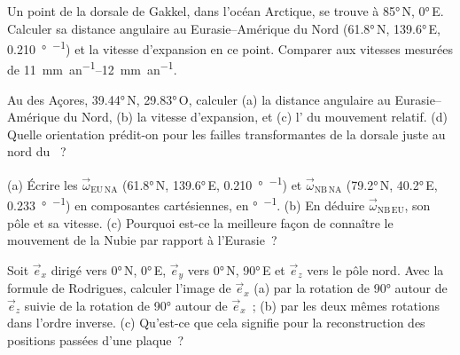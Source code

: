 \begin{exercise}[$\star\star$]\label{exo:b1:plate-kinematics:5}
Un point de la dorsale de Gakkel, dans l'océan Arctique, se trouve à \ang{85}\,N, \ang{0}\,E.
Calculer sa distance angulaire au  Eurasie--Amérique du Nord
(\ang{61.8}\,N, \ang{139.6}\,E, \qty{0.210}{\degree\per\Ma}) et la vitesse d'expansion
en ce point. Comparer aux vitesses mesurées de \qtyrange{11}{12}{mm.an^{-1}}.
\end{exercise}

\begin{exercise}[$\star\star$]\label{exo:b1:plate-kinematics:6}
Au  des Açores, \ang{39.44}\,N, \ang{29.83}\,O, calculer (a) la
distance angulaire au  Eurasie--Amérique du Nord, (b) la vitesse
d'expansion, et (c) l' du mouvement relatif. (d) Quelle orientation
prédit-on pour les failles transformantes de la dorsale juste au nord du ~?
\end{exercise}

\begin{exercise}[$\star\star$]\label{exo:b1:plate-kinematics:7}
(a) Écrire les  $\vec\omega_{\mathrm{EU\,NA}}$ (\ang{61.8}\,N,
\ang{139.6}\,E, \qty{0.210}{\degree\per\Ma}) et $\vec\omega_{\mathrm{NB\,NA}}$
(\ang{79.2}\,N, \ang{40.2}\,E, \qty{0.233}{\degree\per\Ma}) en composantes
cartésiennes, en \unit{\degree\per\Ma}. (b) En déduire $\vec\omega_{\mathrm{NB\,EU}}$,
son pôle et sa vitesse. (c) Pourquoi est-ce la meilleure façon de connaître le mouvement de la Nubie
par rapport à l'Eurasie~?
\end{exercise}

\begin{exercise}[$\star\star$]\label{exo:b1:plate-kinematics:8}
Soit $\vec e_x$ dirigé vers \ang{0}\,N, \ang{0}\,E, $\vec e_y$ vers \ang{0}\,N,
\ang{90}\,E et $\vec e_z$ vers le pôle nord. Avec la formule de Rodrigues, calculer
l'image de $\vec e_x$ (a) par la rotation de \ang{90} autour de $\vec e_z$
suivie de la rotation de \ang{90} autour de $\vec e_x$~; (b) par les deux mêmes
rotations dans l'ordre inverse. (c) Qu'est-ce que cela signifie pour la
reconstruction des positions passées d'une plaque~?
\end{exercise}

